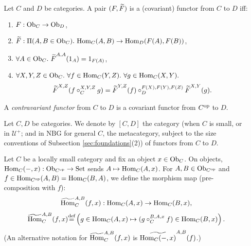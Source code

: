 \documentclass[10pt,a4paper]{article}
\begin{document}
\begin{definition}\label{def:functor}
Let $C$ and $D$ be categories. A pair $(F, {\widetilde{F}\textrm{}})$ is a (covariant) functor from $C$ to $D$ iff:
\begin{enumerate}
\item $F : {\textrm{Ob}}_C \to {\textrm{Ob}}_D$,
\item $\FMor : \Pi(A, B \in \Ob_C).\ \Hom_C(A,B) \to \Hom_D(F(A), F(B))$,
\item $\forall A\in \Ob_C.\ \FMor^{A,A}(1_A)=1_{F(A)}$,
\item $\forall X,Y,Z \in {\textrm{Ob}}_C.\ \forall f\in{\textrm{Hom}}_C(Y,Z).\ \forall g\in{\textrm{Hom}}_C(X,Y).$
$${\widetilde{F}\textrm{}}^{X,Z}(f\circ_C^{X,Y,Z} g)={\widetilde{F}\textrm{}}^{Y,Z}(f)\circ_D^{F(X),F(Y),F(Z)} {\widetilde{F}\textrm{}}^{X,Y}(g).$$
\end{enumerate}
A \emph{contravariant functor} from $C$ to $D$ is a covariant functor from $C^{\textrm{op}}$ to $D$.
\end{definition}

\begin{definition}\label{def:fun_class}
Let $C, D$ be categories. We denote by $[C,D]$ the category (when $C$ is small, or in $\mathcal{U}^+$; and in $\mathrm{NBG}$ for general $C$, the metacategory, subject to the size conventions of Subsection \ref{sec:foundations}(2)) of functors from $C$ to $D$.
\end{definition}

\begin{definition}\label{def:hommor}
Let $C$ be a locally small category and fix an object $x \in {\textrm{Ob}}_C$. On objects, ${\textrm{Hom}}_C(-,x) : {\textrm{Ob}}_{C^{\textrm{op}}} \to {\textrm{Set}}$ sends $A \mapsto {\textrm{Hom}}_C(A,x)$.
For $A,B \in {\textrm{Ob}}_{C^{\textrm{op}}}$ and $f \in {\textrm{Hom}}_{C^{\textrm{op}}}(A,B) = {\textrm{Hom}}_C(B,A)$, we define the morphism map (pre-composition with $f$):
$${\widetilde{{\textrm{Hom}}}\textrm{}}^{A,B}_C(f,x) : {\textrm{Hom}}_C(A,x) \to {\textrm{Hom}}_C(B,x),$$
$${\widetilde{{\textrm{Hom}}}\textrm{}}^{A,B}_C(f,x) {\stackrel{{\textrm{def}}}{=}} \left(g \in {\textrm{Hom}}_C(A,x) \mapsto (g \circ_C^{B,A,x} f) \in {\textrm{Hom}}_C(B,x)\right).$$
(An alternative notation for ${\widetilde{{\textrm{Hom}}}\textrm{}}^{A,B}_C(f,x)$ is $\widetilde{{\textrm{Hom}}_C(-,x)}^{A,B}(f)$.)
\end{definition}
\end{document}
